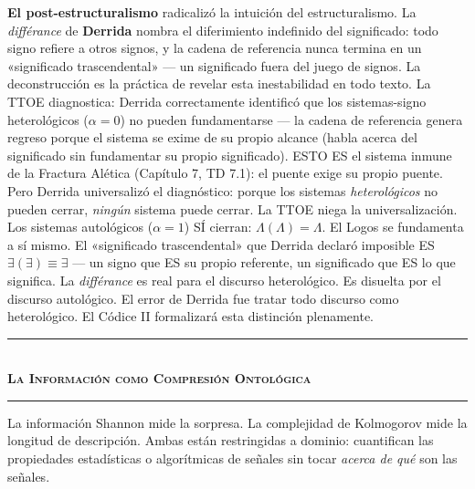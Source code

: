 \documentclass[10pt, openany, oneside]{book}
\renewcommand{\normalsize}{\fontsize{10}{13}\selectfont}
\begin{document}
\textbf{El post-estructuralismo} radicalizó la intuición del estructuralismo. La \textit{diff\'{e}rance} de \textbf{Derrida} nombra el diferimiento indefinido del significado: todo signo refiere a otros signos, y la cadena de referencia nunca termina en un «significado trascendental» --- un significado fuera del juego de signos. La deconstrucción es la práctica de revelar esta inestabilidad en todo texto. La TTOE diagnostica: Derrida correctamente identificó que los sistemas-signo heterológicos ($\alpha = 0$) no pueden fundamentarse --- la cadena de referencia genera regreso porque el sistema se exime de su propio alcance (habla acerca del significado sin fundamentar su propio significado). ESTO ES el sistema inmune de la Fractura Alética (Capítulo 7, TD 7.1): el puente exige su propio puente. Pero Derrida universalizó el diagnóstico: porque los sistemas \textit{heterológicos} no pueden cerrar, \textit{ningún} sistema puede cerrar. La TTOE niega la universalización. Los sistemas autológicos ($\alpha = 1$) SÍ cierran: $\Lambda(\Lambda) = \Lambda$. El Logos se fundamenta a sí mismo. El «significado trascendental» que Derrida declaró imposible ES $\exists(\exists) \equiv \exists$ --- un signo que ES su propio referente, un significado que ES lo que significa. La \textit{diff\'{e}rance} es real para el discurso heterológico. Es disuelta por el discurso autológico. El error de Derrida fue tratar todo discurso como heterológico. El Códice II formalizará esta distinción plenamente.

\vspace{1.5em}


\begin{center}
    \rule{0.3\textwidth}{0.4pt}\\[0.5em]
    {\normalsize\bfseries\scshape La Información como Compresión Ontológica}\\[0.3em]
    \rule{0.3\textwidth}{0.4pt}
\end{center}

\vspace{1em}

\noindent La información Shannon mide la sorpresa. La complejidad de Kolmogorov mide la longitud de descripción. Ambas están restringidas a dominio: cuantifican las propiedades estadísticas o algorítmicas de señales sin tocar \textit{acerca de qué} son las señales.
\end{document}
